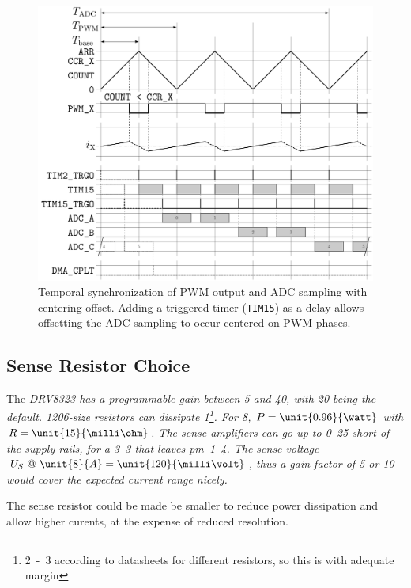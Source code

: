 \documentclass[12pt,a4paper,oneside,openany]{article}
\begin{document}
\begin{figure}[htbp]
\begin{center}
\includegraphics[scale=0.4]{n17-servo-pwm-adc-offset.pdf}
\caption[PWM and ADC Sync with Offset]{Temporal synchronization of PWM output and ADC sampling with centering offset. Adding a triggered timer  (\texttt{TIM15}) as a delay allows offsetting the ADC sampling to occur centered on PWM phases.}
\label{fig:pwm-adc-offset}
\end{center}
\end{figure}

\subsection{Sense Resistor Choice}

The \em DRV8323 \em has a programmable gain between 5 and 40, with 20 being the default. 1206-size resistors can dissipate \unit{1}{\watt}\footnote{\unit{2-3}{\watt} according to datasheets for different resistors, so this is with adequate margin}. For \unit{8}{\ampere}, $P = \unit{0.96}{\watt}$ with $R=\unit{15}{\milli\ohm}$. The sense amplifiers can go up to \unit{0.25}{\volt} short of the supply rails, for a \unit{3.3}{\volt} that leaves \unit{\pm 1.4}{\volt}. The sense voltage $U_S \ @ \  \unit{8}{A}=\unit{120}{\milli\volt}$, thus a gain factor of 5 or 10 would cover the expected current range nicely.

The sense resistor could be made be smaller to reduce power dissipation and allow higher curents, at the expense of reduced resolution.
\end{document}
